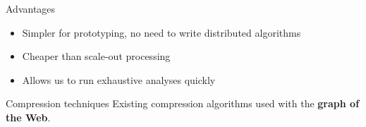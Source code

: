 \documentclass[aspectratio=169,xcolor=table]{beamer}
\begin{document}
\begin{frame}
        \begin{block}{Advantages}
            \begin{itemize}
                \item Simpler for prototyping, no need to write distributed
                    algorithms
                \item Cheaper than scale-out processing
                \item Allows us to run exhaustive analyses quickly
            \end{itemize}
        \end{block}

        \begin{block}{Compression techniques}
            Existing compression algorithms used with the
            \textbf{graph of the Web}.
        \end{block}
    \end{frame}
\end{document}
